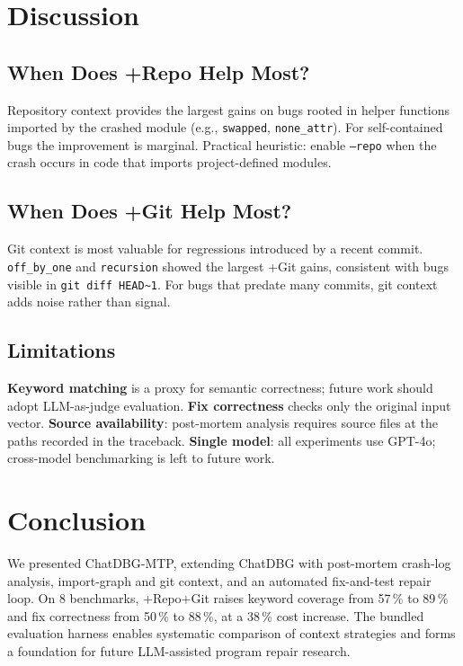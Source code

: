 \documentclass[conference]{IEEEtran}
\begin{document}
\section{Discussion}

\subsection{When Does +Repo Help Most?}
Repository context provides the largest gains on bugs rooted in helper functions
imported by the crashed module (e.g., \texttt{swapped}, \texttt{none\_attr}).
For self-contained bugs the improvement is marginal. Practical heuristic:
enable \texttt{--repo} when the crash occurs in code that imports
project-defined modules.

\subsection{When Does +Git Help Most?}
Git context is most valuable for regressions introduced by a recent commit.
\texttt{off\_by\_one} and \texttt{recursion} showed the largest +Git gains,
consistent with bugs visible in \texttt{git diff HEAD\textasciitilde1}. For
bugs that predate many commits, git context adds noise rather than signal.

\subsection{Limitations}
\textbf{Keyword matching} is a proxy for semantic correctness; future work
should adopt LLM-as-judge evaluation.
\textbf{Fix correctness} checks only the original input vector.
\textbf{Source availability}: post-mortem analysis requires source files
at the paths recorded in the traceback.
\textbf{Single model}: all experiments use GPT-4o; cross-model benchmarking
is left to future work.

\section{Conclusion}
We presented ChatDBG-MTP, extending ChatDBG with post-mortem crash-log
analysis, import-graph and git context, and an automated fix-and-test repair
loop. On 8 benchmarks, +Repo+Git raises keyword coverage from 57\,\% to 89\,\%
and fix correctness from 50\,\% to 88\,\%, at a 38\,\% cost increase. The
bundled evaluation harness enables systematic comparison of context strategies
and forms a foundation for future LLM-assisted program repair research.
\end{document}

